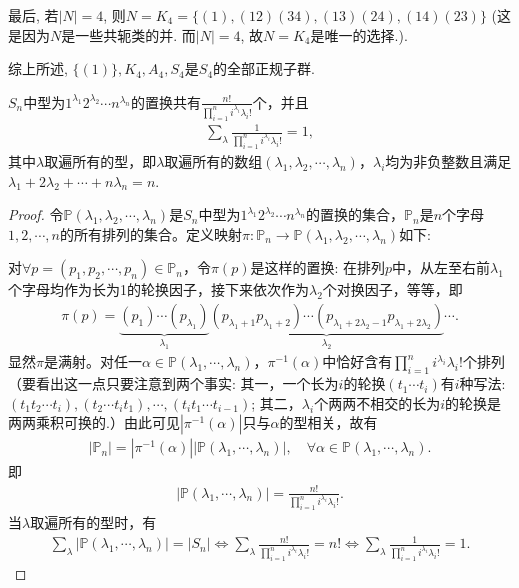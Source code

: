 \documentclass[../../main.tex]{subfiles}%
\begin{document}
\begin{solution}
最后, 若$|N| = 4$, 则$N = K_4 = \{(1), (12)(34), (13)(24), (14)(23)\}$ (这是因为$N$是一些共轭类的并. 而$|N| = 4$, 故$N = K_4$是唯一的选择.).

综上所述, $\{(1)\}, K_4, A_4, S_4$是$S_4$的全部正规子群.

\end{solution}

\begin{proposition}\label{proposition:置换的型相关结论}
$S_n$中型为$1^{\lambda_1}2^{\lambda_2}\cdots n^{\lambda_n}$的置换共有$\frac{n!}{\prod\limits_{i=1}^n i^{\lambda_i}\lambda_i!}$个，并且
\begin{align*}
\sum\limits_{\lambda} \frac{1}{\prod\limits_{i=1}^n i^{\lambda_i}\lambda_i!} = 1,
\end{align*}
其中$\lambda$取遍所有的型，即$\lambda$取遍所有的数组$(\lambda_1,\lambda_2,\cdots,\lambda_n)$，$\lambda_i$均为非负整数且满足$\lambda_1 + 2\lambda_2 + \cdots + n\lambda_n = n$.
\end{proposition}
\begin{proof}
令$\mathbb{P}(\lambda_1,\lambda_2,\cdots,\lambda_n)$是$S_n$中型为$1^{\lambda_1}2^{\lambda_2}\cdots n^{\lambda_n}$的置换的集合，$\mathbb{P}_n$是$n$个字母$1,2,\cdots,n$的所有排列的集合。定义映射$\pi: \mathbb{P}_n \to \mathbb{P}(\lambda_1,\lambda_2,\cdots,\lambda_n)$如下:

对$\forall p=(p_1,p_2,\cdots,p_n)\in\mathbb{P}_n$，令$\pi(p)$是这样的置换: 在排列$p$中，从左至右前$\lambda_1$个字母均作为长为1的轮换因子，接下来依次作为$\lambda_2$个对换因子，等等，即
\begin{align*}
\pi(p) = \underbrace{(p_1)\cdots(p_{\lambda_1})}_{\lambda_1} \underbrace{(p_{\lambda_1+1}p_{\lambda_1+2})\cdots(p_{\lambda_1+2\lambda_2-1}p_{\lambda_1+2\lambda_2})}_{\lambda_2} \cdots.
\end{align*}
显然$\pi$是满射。对任一$\alpha\in\mathbb{P}(\lambda_1,\cdots,\lambda_n)$，$\pi^{-1}(\alpha)$中恰好含有$\prod\limits_{i=1}^n i^{\lambda_i}\lambda_i!$个排列（要看出这一点只要注意到两个事实: 其一，一个长为$i$的轮换$(t_1\cdots t_i)$有$i$种写法: $(t_1t_2\cdots t_i), (t_2\cdots t_it_1), \cdots, (t_it_1\cdots t_{i-1})$; 其二，$\lambda_i$个两两不相交的长为$i$的轮换是两两乘积可换的.）由此可见$|\pi^{-1}(\alpha)|$只与$\alpha$的型相关，故有
\begin{align*}
|\mathbb{P}_n| = |\pi^{-1}(\alpha)| |\mathbb{P}(\lambda_1,\cdots,\lambda_n)|, \quad \forall \alpha\in\mathbb{P}(\lambda_1,\cdots,\lambda_n).
\end{align*}
即
\begin{align*}
|\mathbb{P}(\lambda_1,\cdots,\lambda_n)| = \frac{n!}{\prod\limits_{i=1}^n i^{\lambda_i}\lambda_i!}.
\end{align*}
当$\lambda$取遍所有的型时，有
\begin{align*}
\sum_{\lambda}{|\mathbb{P} (\lambda _1,\cdots ,\lambda _n)|}=|S_n|\Longleftrightarrow \sum_{\lambda}{\frac{n!}{\prod\limits_{i=1}^n{i^{\lambda _i}\lambda _i!}}}=n!\Longleftrightarrow \sum_{\lambda}{\frac{1}{\prod\limits_{i=1}^n{i^{\lambda _i}\lambda _i!}}}=1.
\end{align*}

\end{proof}
\end{document}
